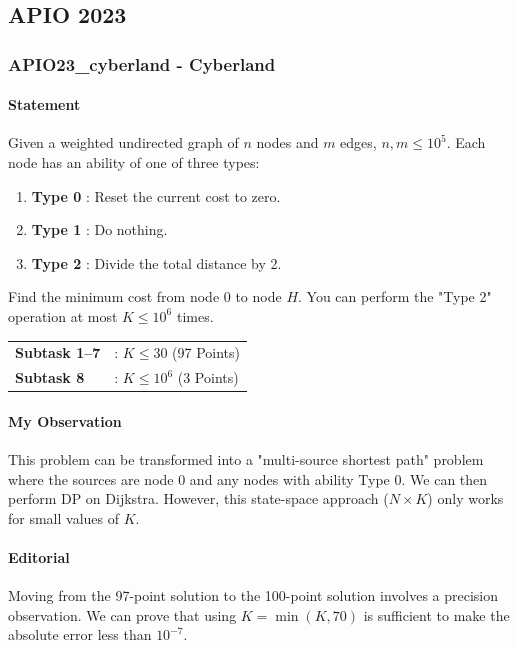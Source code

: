 \subsection{APIO 2023}

\subsubsection{APIO23\_cyberland - Cyberland}


\paragraph{Statement}
Given a weighted undirected graph of $n$ nodes and $m$ edges, $n, m \le 10^5$. Each node has an ability of one of three types: 
\begin{enumerate}[nosep, leftmargin=3em]
    \item \textbf{Type 0} : Reset the current cost to zero.
    \item \textbf{Type 1} : Do nothing.
    \item \textbf{Type 2} : Divide the total distance by 2.
\end{enumerate}
Find the minimum cost from node $0$ to node $H$. You can perform the "Type 2" operation at most $K \le 10^6$ times.

\indent \begin{tabular}{ll}
    \textbf{Subtask 1--7} & : $K \le 30$ (97 Points) \\
    \textbf{Subtask 8}    & : $K \le 10^6$ (3 Points)
\end{tabular}

\paragraph{My Observation}
This problem can be transformed into a "multi-source shortest path" problem where the sources are node $0$ and any nodes with ability Type 0. We can then perform DP on Dijkstra. However, this state-space approach ($N \times K$) only works for small values of $K$.

\paragraph{Editorial}
Moving from the 97-point solution to the 100-point solution involves a precision observation. We can prove that using $K = \min(K, 70)$ is sufficient to make the absolute error less than $10^{-7}$.

